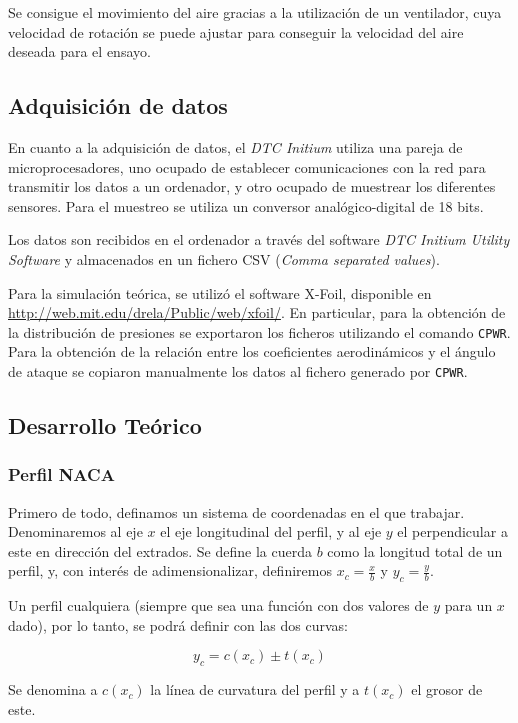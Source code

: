 \documentclass{article}
\begin{document}
Se consigue el movimiento del aire gracias a la utilización de un ventilador, cuya velocidad de rotación se puede ajustar
para conseguir la velocidad del aire deseada para el ensayo.

\subsection{Adquisición de datos}

En cuanto a la adquisición de datos, el \textit{DTC Initium} utiliza una pareja de microprocesadores, uno ocupado de establecer
comunicaciones con la red para transmitir los datos a un ordenador, y otro ocupado de muestrear los diferentes sensores. 
Para el muestreo se utiliza un conversor analógico-digital de 18 bits. 

Los datos son recibidos en el ordenador a través del software \textit{DTC Initium Utility Software} y almacenados en un fichero
CSV (\textit{Comma separated values}). 

Para la simulación teórica, se utilizó el software X-Foil, disponible en \url{http://web.mit.edu/drela/Public/web/xfoil/}.
En particular, para la obtención de la distribución de presiones se exportaron los ficheros utilizando el comando
\verb+CPWR+. Para la obtención de la relación entre los coeficientes aerodinámicos y el ángulo de ataque se 
copiaron manualmente los datos al fichero generado por \verb+CPWR+.

\subsection{Desarrollo Teórico}

\subsubsection{Perfil NACA}

Primero de todo, definamos un sistema de coordenadas en el que trabajar. Denominaremos al eje $x$ el eje longitudinal
del perfil, y al eje $y$ el perpendicular a este en dirección del extrados. Se define la cuerda $b$ como la longitud total
de un perfil, y, con interés de adimensionalizar, definiremos $x_c = \frac{x}{b}$ y $y_c = \frac{y}{b}$.

Un perfil cualquiera (siempre que sea una función con dos valores de $y$ para un $x$ dado), por lo tanto, se podrá definir 
con las dos curvas:

$$y_c = c(x_c) \pm t(x_c)$$

Se denomina a $c(x_c)$ la línea de curvatura del perfil y a $t(x_c)$ el grosor de este. 
\end{document}

